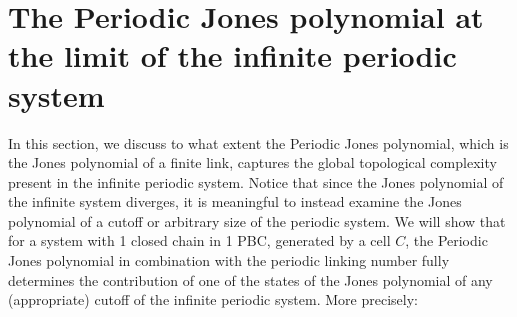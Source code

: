 \documentclass{article}
\begin{document}
\section{The Periodic Jones polynomial at the limit of the infinite periodic system}\label{sec_mpl_inf}

In this section, we discuss to what extent the Periodic Jones polynomial, which is the Jones polynomial of a finite link, captures the global topological complexity present in the infinite periodic system. Notice that since the Jones polynomial of the infinite system diverges, it is meaningful to instead examine the Jones polynomial of a cutoff or arbitrary size of the periodic system. We will show that for a system with 1 closed chain in 1 PBC, generated by a cell $C$, the Periodic Jones polynomial in combination with the periodic linking number fully determines the contribution of one of the states of the Jones polynomial of any (appropriate) cutoff of the infinite periodic system.  More precisely:
\end{document}
